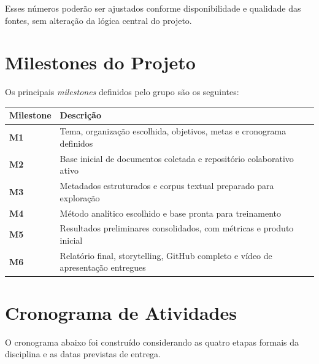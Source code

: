 \documentclass[12pt,a4paper]{article}
\begin{document}
Esses números poderão ser ajustados conforme disponibilidade e qualidade das fontes, sem alteração da lógica central do projeto.

\clearpage
\section{Milestones do Projeto}

Os principais \textit{milestones} definidos pelo grupo são os seguintes:

\begin{center}
\renewcommand{\arraystretch}{1.25}
\begin{tabularx}{\textwidth}{>{\bfseries}p{3.0cm} Y}
\toprule
Milestone & Descrição \\
\midrule
M1 & Tema, organização escolhida, objetivos, metas e cronograma definidos \\
M2 & Base inicial de documentos coletada e repositório colaborativo ativo \\
M3 & Metadados estruturados e corpus textual preparado para exploração \\
M4 & Método analítico escolhido e base pronta para treinamento \\
M5 & Resultados preliminares consolidados, com métricas e produto inicial \\
M6 & Relatório final, storytelling, GitHub completo e vídeo de apresentação entregues \\
\bottomrule
\end{tabularx}
\end{center}

\clearpage
\section{Cronograma de Atividades}

O cronograma abaixo foi construído considerando as quatro etapas formais da disciplina e as datas previstas de entrega.
\end{document}

